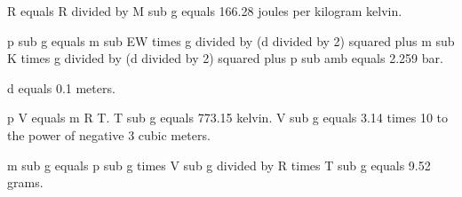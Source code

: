 R equals R divided by M sub g equals 166.28 joules per kilogram kelvin.  

p sub g equals m sub EW times g divided by (d divided by 2) squared plus m sub K times g divided by (d divided by 2) squared plus p sub amb equals 2.259 bar.  

d equals 0.1 meters.  

p V equals m R T.  
T sub g equals 773.15 kelvin.  
V sub g equals 3.14 times 10 to the power of negative 3 cubic meters.  

m sub g equals p sub g times V sub g divided by R times T sub g equals 9.52 grams.